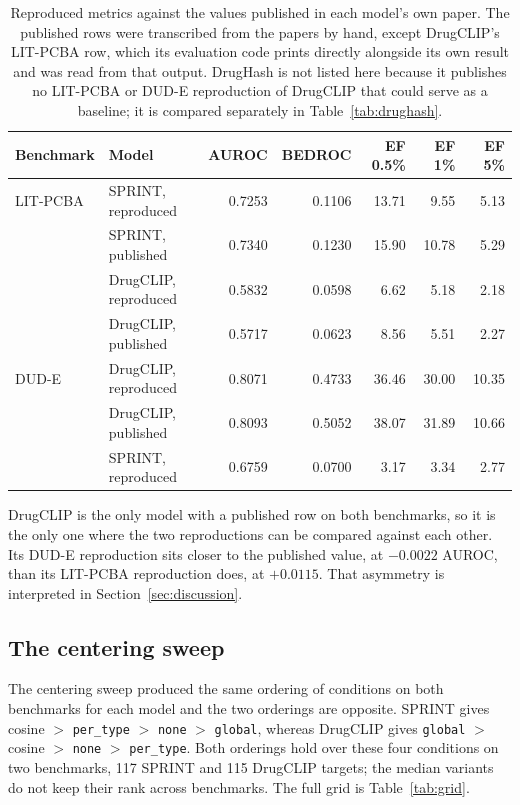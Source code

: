 \documentclass[10pt,a4paper]{article}
\begin{document}
\begin{table}[h]
\centering
\small
\caption{\label{tab:repro}Reproduced metrics against the values published in each model's own paper. The
published rows were transcribed from the papers by hand, except DrugCLIP's LIT-PCBA row,
which its evaluation code prints directly alongside its own result and was read from that
output. DrugHash is not listed here because it publishes no LIT-PCBA or DUD-E reproduction of
DrugCLIP that could serve as a baseline; it is compared separately in Table~\ref{tab:drughash}.}
\setlength{\tabcolsep}{3.5pt}
\begin{tabular}{llrrrrr}
\toprule
Benchmark & Model & AUROC & BEDROC & EF 0.5\% & EF 1\% & EF 5\% \\
\midrule
LIT-PCBA & SPRINT, reproduced & 0.7253 & 0.1106 & 13.71 & 9.55 & 5.13 \\
 & SPRINT, published & 0.7340 & 0.1230 & 15.90 & 10.78 & 5.29 \\
 & DrugCLIP, reproduced & 0.5832 & 0.0598 & 6.62 & 5.18 & 2.18 \\
 & DrugCLIP, published & 0.5717 & 0.0623 & 8.56 & 5.51 & 2.27 \\
\midrule
DUD-E & DrugCLIP, reproduced & 0.8071 & 0.4733 & 36.46 & 30.00 & 10.35 \\
 & DrugCLIP, published & 0.8093 & 0.5052 & 38.07 & 31.89 & 10.66 \\
 & SPRINT, reproduced & 0.6759 & 0.0700 & 3.17 & 3.34 & 2.77 \\
\bottomrule
\end{tabular}
\end{table}

DrugCLIP is the only model with a published row on both benchmarks, so it is the only one
where the two reproductions can be compared against each other. Its DUD-E reproduction sits
closer to the published value, at $-0.0022$ AUROC, than its LIT-PCBA reproduction does, at
$+0.0115$. That asymmetry is interpreted in Section~\ref{sec:discussion}.

\subsection{The centering sweep}\label{sec:centering-sweep}
The centering sweep produced the same ordering of conditions on both benchmarks for each model
and the two orderings are opposite. SPRINT gives cosine $>$ \texttt{per\_type} $>$
\texttt{none} $>$ \texttt{global}, whereas DrugCLIP gives \texttt{global} $>$ cosine $>$
\texttt{none} $>$ \texttt{per\_type}. Both orderings hold over these four conditions on two
benchmarks, 117 SPRINT and 115 DrugCLIP targets; the median variants do not keep their rank
across benchmarks. The full grid is Table~\ref{tab:grid}.
\end{document}
